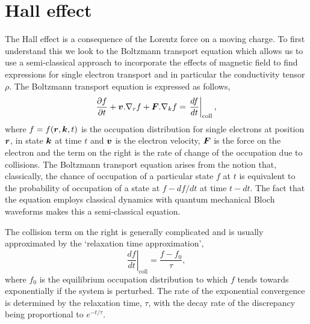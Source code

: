 
\section{Hall effect}

The Hall effect is a consequence of the Lorentz force on a moving charge. To first understand this we look to the Boltzmann transport equation which allows us to use a semi-classical approach to incorporate the effects of magnetic field to find expressions for single electron transport and in particular the conductivity tensor $\rho$. The Boltzmann transport equation is expressed as follows,
\begin{equation}
    \label{Eqn:Theo:BTE}
     \frac{\partial f}{\partial t} + \boldsymbol{v}.\nabla_r f + \boldsymbol{F} . \nabla_k f = \left.\frac{d f}{d t}\right|_{\textrm{coll}},
\end{equation}
where $f = f(\boldsymbol{r}, \boldsymbol{k}, t)$ is the occupation distribution for single electrons at position $\boldsymbol{r}$, in state $\boldsymbol{k}$ at time $t$ and $\boldsymbol{v}$ is the electron velocity, $\boldsymbol{F}$ is the force on the electron and the term on the right is the rate of change of the occupation due to collisions. The Boltzmann transport equation arises from the notion that, classically, the chance of occupation of a particular state $f$ at $t$ is equivalent to the probability of occupation of a state at $f - df/dt$ at time $t-dt$. The fact that the equation employs classical dynamics with quantum mechanical Bloch waveforms makes this a semi-classical equation.

The collision term on the right is generally complicated and is usually approximated by the `relaxation time approximation',
\begin{equation}
    \left.\frac{d f}{d t}\right|_{\textrm{coll}} = \frac{f - f_0}{\tau},
\end{equation}
where $f_0$ is the equilibrium occupation distribution to which $f$ tends towards exponentially if the system is perturbed. The rate of the exponential convergence is determined by the relaxation time, $\tau$, with the decay rate of the discrepancy being proportional to $e^{-t/\tau}$.

